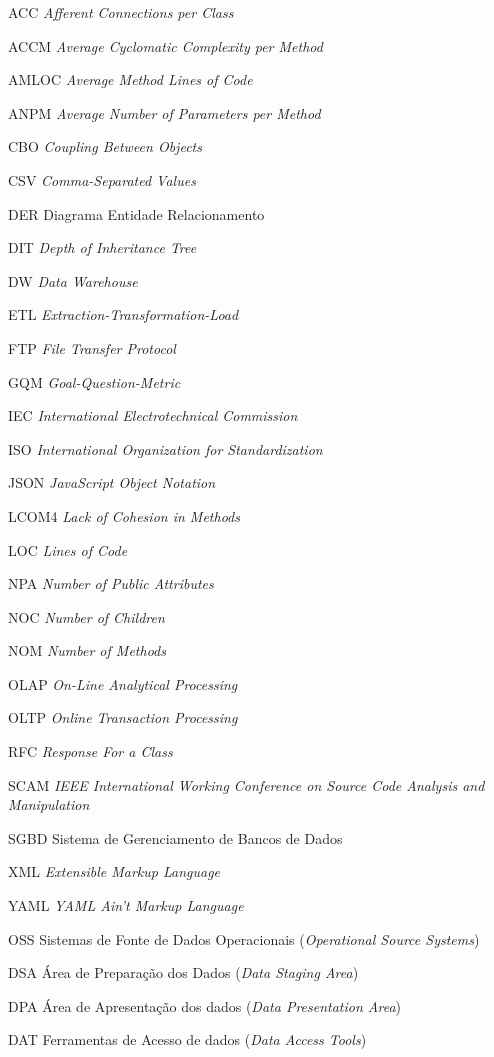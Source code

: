 \begin{siglas}
\item [ACC]   \textit{Afferent Connections per Class}
\item [ACCM]  \textit{Average Cyclomatic Complexity per Method}
\item [AMLOC] \textit{Average Method Lines of Code}
\item [ANPM]  \textit{Average Number of Parameters per Method}
\item [CBO]   \textit{Coupling Between Objects}
\item [CSV]   \textit{Comma-Separated Values}
\item [DER]	  Diagrama Entidade Relacionamento
\item [DIT]	  \textit{Depth of Inheritance Tree}
\item [DW]	  \textit{Data Warehouse}
\item [ETL]   \textit{Extraction-Transformation-Load}
\item [FTP]   \textit{File Transfer Protocol}
\item [GQM]   \textit{Goal-Question-Metric}
\item [IEC]   \textit{International Electrotechnical Commission}
\item [ISO]   \textit{International Organization for Standardization}
\item [JSON]   \textit{JavaScript Object Notation}
\item [LCOM4] \textit{Lack of Cohesion in Methods}
\item [LOC]   \textit{Lines of Code}
\item [NPA]   \textit{Number of Public Attributes}
\item [NOC]   \textit{Number of Children}
\item [NOM]   \textit{Number of Methods}
\item [OLAP]  \textit{On-Line Analytical Processing}
\item [OLTP]  \textit{Online Transaction Processing}
\item [RFC]   \textit{Response For a Class}
\item [SCAM]  \textit{IEEE International Working Conference on Source Code Analysis and Manipulation}
\item [SGBD]  Sistema de Gerenciamento de Bancos de Dados
\item [XML]    \textit{Extensible Markup Language}
\item [YAML]   \textit{YAML Ain't Markup Language}  

\item [OSS] Sistemas de Fonte de Dados Operacionais (\textit{Operational Source Systems})
\item [DSA] Área de Preparação dos Dados (\textit{Data Staging Area})
\item [DPA] Área de Apresentação dos dados (\textit{Data Presentation Area})
\item [DAT] Ferramentas de Acesso de dados (\textit{Data Access Tools})

\end{siglas}
